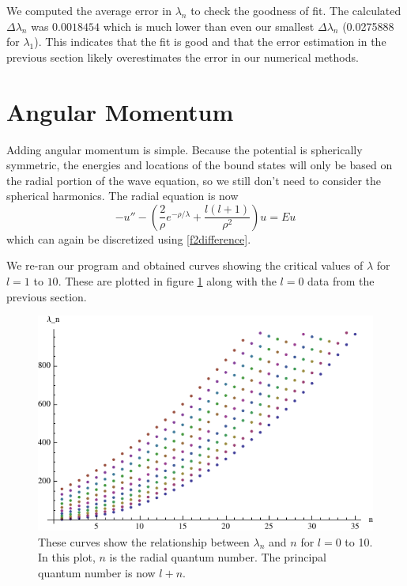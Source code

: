 \documentclass[12pt,twoside]{reedthesis}
\newcommand{\eqn}[1]{\begin{equation}#1\end{equation}}
\begin{document}
We computed the average error in $\lambda_n$ to check the goodness of fit. The calculated $\Delta \lambda_n$ was $0.0018454$ which is much lower than even our smallest $\Delta \lambda_n$ (0.0275888 for $\lambda_1$). This indicates that the fit is good and that the error estimation in the previous section likely overestimates the error in our numerical methods.

\section{Angular Momentum}

Adding angular momentum is simple. Because the potential is spherically symmetric, the energies and locations of the bound states will only be based on the radial portion of the wave equation, so we still don't need to consider the spherical harmonics. The radial equation is now
\eqn{
-u'' - \left(\frac{2}{\rho}e^{-\rho/\lambda} + \frac{l(l+1)}{\rho^2}\right) u = E u
\label{eq:angmomentum}
}
which can again be discretized using \eqref{f2difference}. 

We re-ran our program and obtained curves showing the critical values of $\lambda$ for $l = 1$ to $10$. These are plotted in figure \ref{fig:allthelcs} along with the $l = 0$ data from the previous section.

\begin{figure}[h]
\centering
\includegraphics{Figures/allthelcs}
\caption[Plots of $\lambda_n$ versus $n$ for $l = 0$ to $10$]{These curves show the relationship between $\lambda_n$ and $n$ for $l = 0$ to 10. In this plot, $n$ is the radial quantum number. The principal quantum number is now $l + n$.}
\label{fig:allthelcs}
\end{figure}
\end{document}
